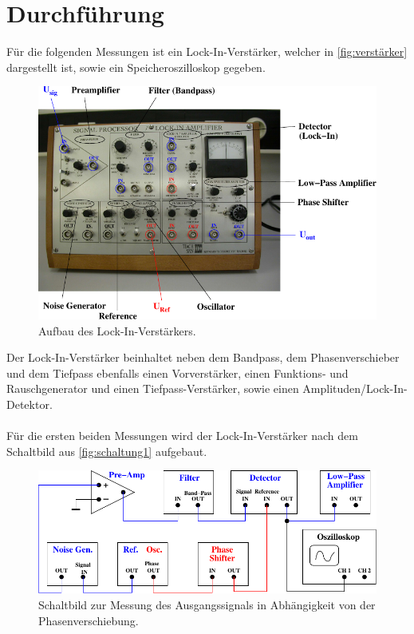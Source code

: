 \section{Durchführung}
\label{durchfuehrung}

    Für die folgenden Messungen ist ein Lock-In-Verstärker,
    welcher in \autoref{fig:verstärker} dargestellt ist,
    sowie ein Speicheroszilloskop gegeben.
    \begin{figure}[H]
        \centering
        \includegraphics[width=\textwidth]{content/img/Abb_3.pdf}
        \caption{Aufbau des Lock-In-Verstärkers. \cite{versuchsanleitung}}
        \label{fig:verstärker}
    \end{figure}
    Der Lock-In-Verstärker beinhaltet neben dem Bandpass,
    dem Phasenverschieber und dem Tiefpass ebenfalls einen Vorverstärker,
    einen Funktions- und Rauschgenerator und einen Tiefpass-Verstärker,
    sowie einen Amplituden/Lock-In-Detektor.\\
    \\
    Für die ersten beiden Messungen wird der Lock-In-Verstärker nach dem Schaltbild aus \autoref{fig:schaltung1} aufgebaut.
    \begin{figure}[H]
        \centering
        \includegraphics{content/img/Abb_4.pdf}
        \caption{Schaltbild zur Messung des Ausgangssignals in Abhängigkeit von der Phasenverschiebung. \cite{versuchsanleitung}}
        \label{fig:schaltung1}
    \end{figure}
